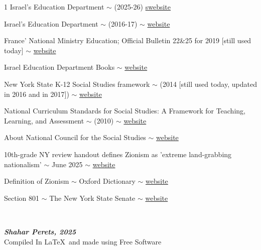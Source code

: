 \documentclass[12pt]{../../../tex/classes/styledArticle}
\begin{document}
	\begin{thebibliography}{1}
		Israel's Education Department $\sim$ (2025-26) \href{https://meyda.education.gov.il/files/Curriculum/history_mm_10_12.pdf}{swebsite}
		
		Israel's Education Department $\sim$ (2016-17) $\sim$ \href{https://meyda.education.gov.il/files/Mazkirut_Pedagogit/MikzootAzmaeem/historia_tachnit_hadasha.pdf}{website}
		
		France' National Ministry Education; Official Bulletin 22\&25 for 2019 [still used today] $\sim$ \href{https://eduscol.education.fr/1667/programmes-et-ressources-en-histoire-geographie-voie-gt}{website} 
		
		Israel Education Department Books $\sim$ \href{https://meyda.education.gov.il/files/noar/70yeras2.pdf}{website}
		
		New York State K-12 Social Studies framework $\sim$ (2014 [still used today, updated in 2016 and in 2017]) $\sim$ \href{https://www.nysed.gov/standards-instruction/social-studies}{website}
		
		 National Curriculum Standards for Social Studies: A Framework for Teaching, Learning, and Assessment $\sim$ (2010) $\sim$ \href{https://www.socialstudies.org/standards/national-curriculum-standards-social-studies}{website}
		
		 About National Council for the Social Studies $\sim$ \href{https://www.socialstudies.org/about}{website}
		
		 10th-grade NY review handout defines Zionism as 'extreme land-grabbing nationalism' $\sim$ June 2025 $\sim$ \href{https://www.jpost.com/diaspora/antisemitism/article-857234}{website}
		
		 Definition of Zionism $\sim$ Oxford Dictionary $\sim$ \href{https://www.oxfordlearnersdictionaries.com/definition/english/zionism}{website}
		
		 Section 801 $\sim$ The New York State Senate $\sim$ \href{https://www.nysenate.gov/legislation/laws/EDN/801}{website}
	\end{thebibliography}
	
	{\large\dotfill\normalsize \\ \vfil {\begin{center}
				{\textbf{\textit{Shahar Perets, 2025}} \\
					\scriptsize Compiled In {\LaTeX}\ and made using Free Software}
		\end{center}} \vfil	}
	
	
	
	
\end{document}
